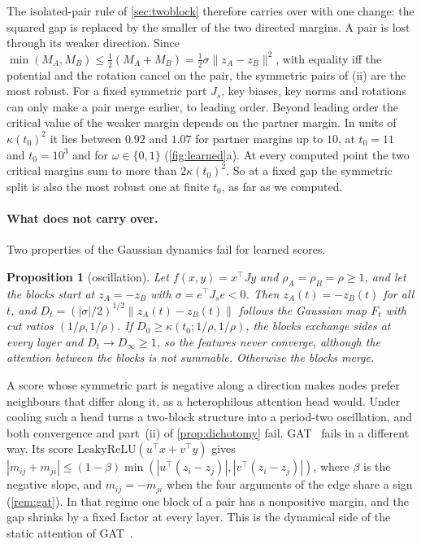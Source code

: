 \documentclass[10pt]{article}
\newtheorem{proposition}{Proposition}
\theoremstyle{definition}
\theoremstyle{remark}
\begin{document}
The isolated-pair rule of \cref{sec:twoblock} therefore carries over with one change: the squared gap is replaced by the smaller of the two
directed margins. A pair is lost through its weaker direction. Since $\min(M_A,M_B)\le\frac12(M_A+M_B)=\frac12\sigma\|z_A-z_B\|^2$, with equality
iff the potential and the rotation cancel on the pair, the symmetric pairs of (ii) are the most robust. For a fixed symmetric part $J_s$, key biases,
key norms and rotations can only make a pair merge earlier, to leading order. Beyond leading order the critical value of the weaker margin
depends on the partner margin. In units of $\kappa(t_0)^2$ it lies between $0.92$ and $1.07$ for partner margins up to $10$, at $t_0=11$ and
$t_0=10^3$ and for $\omega\in\{0,1\}$ (\cref{fig:learned}a). At every computed point the two critical margins sum to more than
$2\kappa(t_0)^2$. So at a fixed gap the symmetric split is also the most robust one at finite $t_0$, as far as we computed.

\paragraph{What does not carry over.} Two properties of the Gaussian dynamics fail for learned scores.

\begin{proposition}[oscillation]\label{prop:oscillation}
Let $f(x,y)=x^\top Jy$ and $\rho_A=\rho_B=\rho\ge1$, and let the blocks start at $z_A=-z_B$ with $\sigma=e^\top J_se<0$. Then $z_A(t)=-z_B(t)$
for all $t$, and $D_t=(|\sigma|/2)^{1/2}\|z_A(t)-z_B(t)\|$ follows the Gaussian map $F_t$ with cut ratios $(1/\rho,1/\rho)$. If
$D_0\ge\kappa(t_0;1/\rho,1/\rho)$, the blocks exchange sides at every layer and $D_t\to D_\infty\ge1$, so the features never converge, although
the attention between the blocks is not summable. Otherwise the blocks merge.
\end{proposition}

A score whose symmetric part is negative along a direction makes nodes prefer neighbours that differ along it, as a heterophilous attention
head would. Under cooling such a head turns a two-block structure into a period-two oscillation, and both convergence and part~(ii) of
\cref{prop:dichotomy} fail. GAT~\citep{velickovic2018} fails in a different way. Its score $\mathrm{LeakyReLU}(u^\top x+v^\top y)$ gives
$|m_{ij}+m_{ji}|\le(1-\beta)\min(|u^\top(z_i-z_j)|,|v^\top(z_i-z_j)|)$, where $\beta$ is the negative slope, and $m_{ij}=-m_{ji}$ when the four
arguments of the edge share a sign (\cref{rem:gat}). In that regime one block of a pair has a nonpositive margin, and the gap shrinks by a fixed
factor at every layer. This is the dynamical side of the static attention of GAT~\citep{brody2022}.
\end{document}
